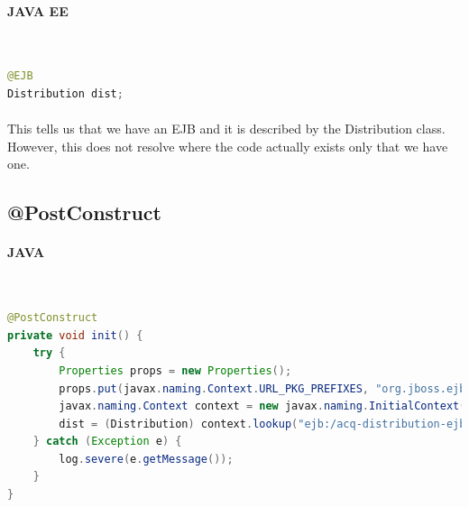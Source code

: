 \documentclass[
10pt, %
letterpaper, %
oneside, %
headinclude,footinclude, %
BCOR5mm, %
]{scrartcl}
\begin{document}

\paragraph{JAVA EE}~
\begin{lstlisting}[language=Java]
@EJB
Distribution dist;
\end{lstlisting}

\paragraph{} This tells us that we have an EJB and it is described by the Distribution class. However, this does not resolve where the code actually exists only that we have one.


\subsection{@PostConstruct}


\paragraph{JAVA}~
\begin{lstlisting}[language=Java]
@PostConstruct
private void init() {
	try {
		Properties props = new Properties();
		props.put(javax.naming.Context.URL_PKG_PREFIXES, "org.jboss.ejb.client.naming");
		javax.naming.Context context = new javax.naming.InitialContext(props);		
		dist = (Distribution) context.lookup("ejb:/acq-distribution-ejb-1.0/DistributionImpl!os.oss.Distribution");
	} catch (Exception e) {
		log.severe(e.getMessage());
	}
}
\end{lstlisting}
\end{document}
